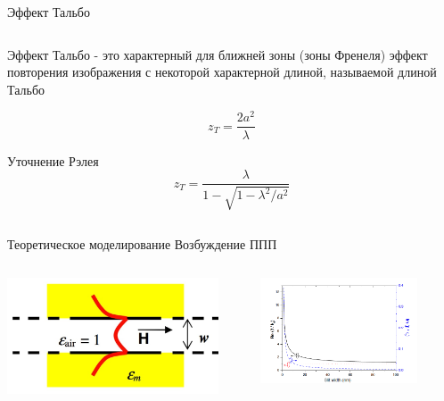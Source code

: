 \documentclass[9pt, compress, xcolor=table]{beamer}
\begin{document}
\begin{frame}{Эффект Тальбо}
\begin{columns}[c]
\begin{center}
Эффект Тальбо - это характерный для ближней зоны (зоны Френеля) эффект повторения изображения с некоторой характерной длиной, называемой длиной Тальбо

\begin{equation*}
z_T=\frac{2a^2}{\lambda}
\end{equation*}

Уточнение Рэлея
\begin{equation*}
z_T=\frac{\lambda}{1-\sqrt{1-\lambda^2/a^2}}
\end{equation*}
\end{center}
\end{columns}

\end{frame}


\begin{frame}{Теоретическое моделирование}
Возбуждение ППП
\begin{columns}[c]
\column{6.5cm}
\begin{center}
\includegraphics[width=0.9\textwidth]{ns0}
\end{center}
\column{6.5cm}
\begin{center}
\includegraphics[width=0.8\textwidth]{ns1}


\end{center}
\end{columns}
\end{frame}
\end{document}
